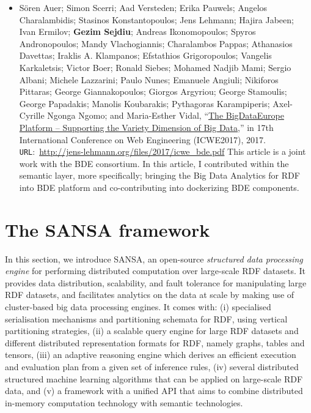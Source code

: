 \begin{itemize}
    \item Sören Auer; Simon Scerri; Aad Versteden; Erika Pauwels; Angelos Charalambidis; Stasinos Konstantopoulos; Jens Lehmann; Hajira Jabeen; Ivan Ermilov; \textbf{Gezim Sejdiu}; Andreas Ikonomopoulos; Spyros Andronopoulos; Mandy Vlachogiannis; Charalambos Pappas; Athanasios Davettas; Iraklis A. Klampanos; Efstathios Grigoropoulos; Vangelis Karkaletsis; Victor Boer; Ronald Siebes; Mohamed Nadjib Mami; Sergio Albani; Michele Lazzarini; Paulo Nunes; Emanuele Angiuli; Nikiforos Pittaras; George Giannakopoulos; Giorgos Argyriou; George Stamoulis; George Papadakis; Manolis Koubarakis; Pythagoras Karampiperis; Axel-Cyrille Ngonga Ngomo; and Maria-Esther Vidal, “\href{http://jens-lehmann.org/files/2017/icwe_bde.pdf}{The BigDataEurope Platform – Supporting the Variety Dimension of Big Data},” in 17th International Conference on Web Engineering (ICWE2017), 2017. \texttt{URL}:~\url{http://jens-lehmann.org/files/2017/icwe_bde.pdf}
    This article is a joint work with the BDE consortium. 
    In this article, I contributed within the semantic layer, more specifically; bringing the Big Data Analytics for RDF into BDE platform and co-contributing into dockerizing BDE components.
    
\end{itemize}


\section{The SANSA framework}
\label{sec:the-sansa-framework}
In this section, we introduce SANSA, an open-source \emph{structured data processing engine} for performing distributed computation over large-scale \gls{RDF} datasets.
It provides data distribution, scalability, and fault tolerance for manipulating large RDF datasets, and facilitates analytics on the data at scale by making use of cluster-based big data processing engines.
It comes with: (i) specialised serialisation mechanisms and partitioning schemata for \gls{RDF}, using vertical partitioning strategies,
(ii) a scalable query engine for large RDF datasets and different distributed representation formats for \gls{RDF}, namely graphs, tables and tensors,
(iii) an adaptive reasoning engine which derives an efficient execution and evaluation plan from a given set of inference rules,
(iv) several distributed structured machine learning algorithms that can be applied on large-scale RDF data,
and (v) a framework with a unified API that aims to combine distributed in-memory computation technology with semantic technologies.

